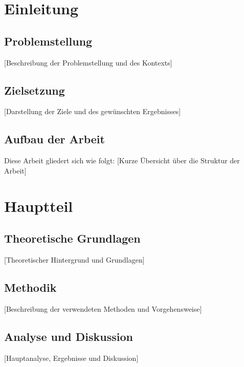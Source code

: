 \documentclass[11pt, a4paper, oneside, ngerman]{article}
\begin{document}
\section{Einleitung}\label{einleitung}

\subsection{Problemstellung}\label{problemstellung}

{[}Beschreibung der Problemstellung und des Kontexts{]}

\subsection{Zielsetzung}\label{zielsetzung}

{[}Darstellung der Ziele und des gewünschten Ergebnisses{]}

\subsection{Aufbau der Arbeit}\label{aufbau-der-arbeit}

Diese Arbeit gliedert sich wie folgt: {[}Kurze Übersicht über die
Struktur der Arbeit{]}

\section{Hauptteil}\label{hauptteil}

\subsection{Theoretische Grundlagen}\label{theoretische-grundlagen}

{[}Theoretischer Hintergrund und Grundlagen{]}

\subsection{Methodik}\label{methodik}

{[}Beschreibung der verwendeten Methoden und Vorgehensweise{]}

\subsection{Analyse und Diskussion}\label{analyse-und-diskussion}

{[}Hauptanalyse, Ergebnisse und Diskussion{]}
\end{document}
